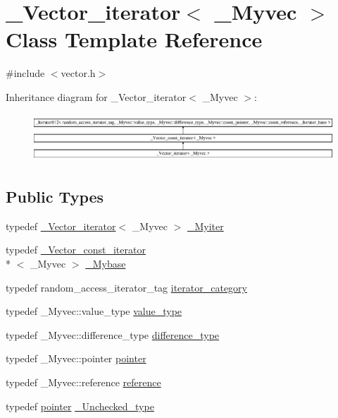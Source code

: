 \hypertarget{class___vector__iterator}{\section{\+\_\+\+Vector\+\_\+iterator$<$ \+\_\+\+Myvec $>$ Class Template Reference}
\label{class___vector__iterator}
}


{\ttfamily \#include $<$vector.\+h$>$}

Inheritance diagram for \+\_\+\+Vector\+\_\+iterator$<$ \+\_\+\+Myvec $>$\+:\begin{figure}[H]
\begin{center}
\leavevmode
\includegraphics[height=1.814255cm]{class___vector__iterator}
\end{center}
\end{figure}
\subsection*{Public Types}
\begin{DoxyCompactItemize}
\item 
typedef \hyperlink{class___vector__iterator}{\+\_\+\+Vector\+\_\+iterator}$<$ \+\_\+\+Myvec $>$ \hyperlink{class___vector__iterator_a207a91d767f8b7b96d0b375b9dbc8731}{\+\_\+\+Myiter}
\item 
typedef \hyperlink{class___vector__const__iterator}{\+\_\+\+Vector\+\_\+const\+\_\+iterator}\\*
$<$ \+\_\+\+Myvec $>$ \hyperlink{class___vector__iterator_a62a662bae2cce37b78e1b581c15b2d2f}{\+\_\+\+Mybase}
\item 
typedef random\+\_\+access\+\_\+iterator\+\_\+tag \hyperlink{class___vector__iterator_a006e733e2d90ae9efd29706dfa13b852}{iterator\+\_\+category}
\item 
typedef \+\_\+\+Myvec\+::value\+\_\+type \hyperlink{class___vector__iterator_a8b4b40f1be9b179c801618301d4c1ca6}{value\+\_\+type}
\item 
typedef \+\_\+\+Myvec\+::difference\+\_\+type \hyperlink{class___vector__iterator_a2ae251a7a575573a37b141db607a2f3d}{difference\+\_\+type}
\item 
typedef \+\_\+\+Myvec\+::pointer \hyperlink{class___vector__iterator_ab246deee0546c9ff56abdda572e6bfdd}{pointer}
\item 
typedef \+\_\+\+Myvec\+::reference \hyperlink{class___vector__iterator_a854f9738b7e51e509531d5b5c649bf8b}{reference}
\item 
typedef \hyperlink{class___vector__const__iterator_a301a1187c227c820bd86335496229e6a}{pointer} \hyperlink{class___vector__iterator_a9707cfb9b3706ab297a178e6afeaae9b}{\+\_\+\+Unchecked\+\_\+type}
\end{DoxyCompactItemize}

